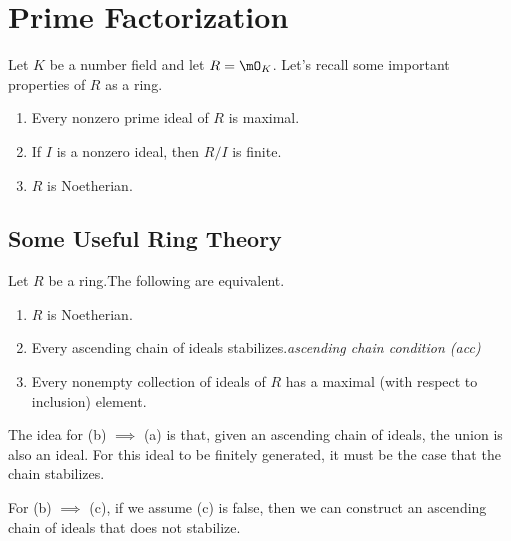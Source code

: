 \documentclass[pmath441]{subfiles}
\begin{document}
    \section{Prime Factorization}
    
    Let $K$ be a number field and let $R=\mO_K$. Let's recall some important properties of $R$ as a ring.
    \begin{enumerate}
        \item Every nonzero prime ideal of $R$ is maximal.
        \item If $I$ is a nonzero ideal, then $R /I$ is finite.
        \item $R$ is Noetherian.
    \end{enumerate}
    
    \subsection{Some Useful Ring Theory}
    
    \begin{prop}{}
        Let $R$ be a ring.\footnotemark[1] The following are equivalent.
        \begin{enumerate}
            \item $R$ is Noetherian.
            \item Every ascending chain of ideals stabilizes.\footnotemark[2] \hfill\textit{ascending chain condition (acc)}
            \item Every nonempty collection of ideals of $R$ has a maximal (with respect to inclusion) element.
        \end{enumerate}
        
        \noindent
        \begin{minipage}{\textwidth}
        \end{minipage}
    \end{prop}
    

    \np The idea for (b) $\implies$ (a) is that, given an ascending chain of ideals, the union is also an ideal. For this ideal to be finitely generated, it must be the case that the chain stabilizes. 

    For (b) $\implies$ (c), if we assume (c) is false, then we can construct an ascending chain of ideals that does not stabilize.
    
\end{document}
